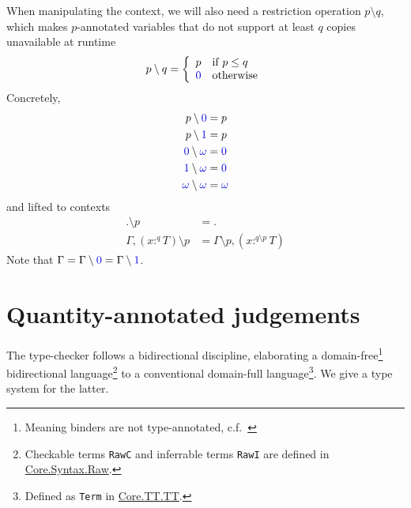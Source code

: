 \documentclass{article}
\newcommand{\OF}{:}
\newcommand{\OFq}[1]{\OF^{#1}}
\newcommand{\EMPTY}{.}
\newcommand{\zero}{{\textcolor{type}{0}}}
\newcommand{\one}{{\textcolor{type}{1}}}
\newcommand{\any}{{\textcolor{type}{\omega}}}
\newcommand{\restrictQ}[2]{#1 \setminus #2}
\newcommand{\restrictAny}[1]{\restrictQ {#1} \any}
\begin{document}
When manipulating the context, we will also need a restriction operation $\restrictQ p q$, which makes $p$-annotated variables that do not support at least $q$ copies unavailable at runtime
$$
\restrictQ p q =
  \left\{
    \begin{array}{ll}
      p & \text{if $p \leq q$} \\
      \zero & \text{otherwise}
    \end{array}
  \right.
$$
Concretely,
\begin{align*}
\restrictQ p \zero &= p\\
\restrictQ p \one &= p\\
\restrictAny \zero &= \zero\\
\restrictAny \one &= \zero\\
\restrictAny \any &= \any
\end{align*}
and lifted to contexts
\begin{align*}
\restrictQ {\EMPTY} p &= \EMPTY\\
\restrictQ {\Gamma, (x \OFq q T)} p &= \restrictQ \Gamma p, (x \OFq {\restrictQ q p} T)
\end{align*}
Note that $\Gamma = \restrictQ \Gamma \zero = \restrictQ \Gamma \one$.

\section{Quantity-annotated judgements}

The type-checker follows a bidirectional discipline, elaborating a domain-free\footnote{Meaning binders are not type-annotated, c.f.~\cite{Barthe2000}} bidirectional language\footnote{Checkable terms \texttt{RawC} and inferrable terms \texttt{RawI} are defined in \href{https://github.com/edwinb/Yaffle/blob/main/src/Core/Syntax/Raw.idr}{Core.Syntax.Raw}.} to a conventional domain-full language\footnote{Defined as \texttt{Term} in \href{https://github.com/edwinb/Yaffle/blob/main/src/Core/TT/TT.idr}{Core.TT.TT}.}. We give a type system for the latter.
\end{document}
